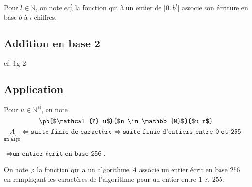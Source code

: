 \documentclass{scrartcl}
\begin{document}
				Pour $l \in \mathbb{N}$, on note $ec_b^l$ la fonction qui à un entier de $[0..b^l[$ associe son écriture en base $b$ à $l$ chiffres.

		\subsection{Addition en base 2}

			cf. fig 2

		\subsection{Application}

			Pour $u \in \mathbb{N}^{\mathbb{N}}$, on note
			\[
				\pb{$\mathcal{P}_u$}{$n \in \mathbb{N}$}{$u_n$}
			\]
			$\underbrace{A}_{\texttt{un algo}} \iff \texttt{suite finie de caractère} 
			\iff \texttt{suite finie d'entiers entre 0 et 255}$

			$\iff \texttt{un entier écrit en base 256}$.

			On note $\varphi$ la fonction qui a un algorithme $A$ associe un entier écrit en base $256$ 
			en remplaçant les caractères de l'algorithme pour un entier entre $1$ et $255$.
\end{document}

